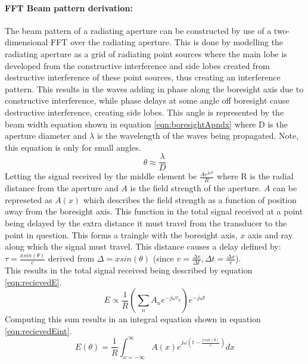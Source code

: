 \paragraph{FFT Beam pattern derivation:}
The beam pattern of a radiating aperture can be constructed by use of a two-dimensional FFT over the radiating aperture. This is done by modelling the radiating aperture as a grid of radiating point sources where the main lobe is developed from the constructive interference and side lobes created from destructive interference of these point sources, thus creating an interference pattern. This results in the waves adding in phase along the boresight axis due to constructive interference, while phase delays at some angle off boresight cause destructive interference, creating side lobes. This angle is represented by the beam width equation shown in equation \ref{eqn:boresightApndx} where D is the aperture diameter and $\lambda$ is the wavelength of the waves being propagated. Note, this equation is only for small angles.
\begin{equation}\label{eqn:boresightApndx}
    \theta \approx \frac{\lambda}{D}
\end{equation}
Letting the signal received by the middle element be $\frac{Ae^{j\omega t}}{R}$ where R is the radial distance from the aperture and $A$ is the field strength of the aperture. $A$ can be represeted as $A(x)$ which describes the field strength as a function of position away from the boresight axis. This function in the total signal received at a point being delayed by the extra distance it must travel from the transducer to the point in question. This forms a traingle with the boresight axis, $x$ axis and ray along which the signal must travel. This distance causes a delay defined by: $ \tau=\frac{xsin(\theta)}{c}$ derived from $\Delta = xsin(\theta)$ (since $v=\frac{\Delta x}{\Delta t}, \Delta t = \frac{\Delta x}{v}$).\\
This results in the total signal received being described by equation \ref{eqn:recievedE}.
\begin{equation}\label{eqn:recievedE}
    E \propto \frac{1}{R} \left( \sum_n A_n e^{-j\omega \tau_n} \right)e^{-j\omega t}
\end{equation}
Computing this sum results in an integral equation shown in equation \ref{eqn:recievedEint}.
\begin{equation}\label{eqn:recievedEint}
    E(\theta) = \frac{1}{R}  \int_{x=-\infty}^\infty A(x) e^{j\omega(t-\frac{xsin(\theta)}{c})}dx
\end{equation}
